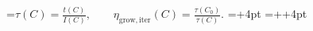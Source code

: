 \documentclass[11pt]{article}
\begin{document}
=\hbox{$\displaystyle \tau(C)=\frac{t(C)}{I(C)},\qquad \eta_{\mathrm{grow,iter}}(C)=\frac{\tau(C_0)}{\tau(C)}.$}
\pdfpagewidth=\dimexpr{}+4pt\relax
\pdfpageheight=\dimexpr{}++4pt\relax
\hoffset=-1in
\voffset=-1in
\shipout\vbox{\kern2pt\hbox{\kern2pt\kern2pt}\kern2pt}
\end{document}
